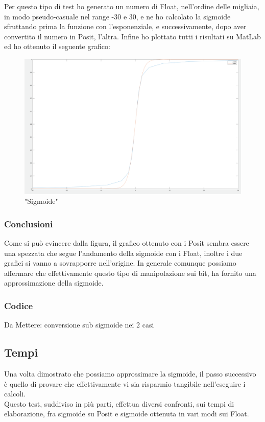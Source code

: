 \documentclass[a4paper,11pt]{article}
\begin{document}
Per questo tipo di test ho generato un numero di Float, nell'ordine delle migliaia, in modo pseudo-casuale nel range -30 e 30, e ne ho calcolato la sigmoide sfruttando prima la funzione con l'esponenziale, e successivamente, dopo aver convertito il numero in Posit, l'altra.
Infine ho plottato tutti i risultati su MatLab ed ho ottenuto il seguente grafico:

\begin{figure}[h]
	\includegraphics[scale=0.15]{sigmoide_2}
	\centering
	\caption{"Sigmoide"}
\end{figure}

\subsubsection{Conclusioni}
Come si può evincere dalla figura, il grafico ottenuto con i  Posit sembra essere una spezzata che segue l'andamento della sigmoide con i Float, inoltre i due grafici si vanno a sovrapporre nell'origine. In generale comunque possiamo affermare che effettivamente questo tipo di manipolazione sui bit, ha fornito una approssimazione della sigmoide.

\subsubsection{Codice}

Da Mettere:
conversione sub
sigmoide nei 2 casi

\subsection{Tempi}

Una volta dimostrato che possiamo approssimare la sigmoide, il passo successivo è quello di provare che effettivamente vi sia risparmio tangibile nell'eseguire i calcoli. \\
Questo test, suddiviso in più parti, effettua diversi confronti, sui tempi di elaborazione, fra sigmoide su Posit e sigmoide ottenuta in vari modi sui Float.
\end{document}
